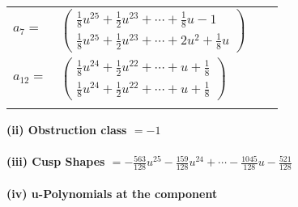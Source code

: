 \documentclass[1p]{elsarticle_modified}
\theoremstyle{definition}
\begin{document}
\begin{tabular}{m{7pt} m{180pt} m{7pt} m{180pt} }
\flushright $a_{7}=$&$\begin{pmatrix}\frac{1}{8} u^{25}+\frac{1}{2} u^{23}+\cdots+\frac{1}{8} u-1\\\frac{1}{8} u^{25}+\frac{1}{2} u^{23}+\cdots+2 u^2+\frac{1}{8} u\end{pmatrix}$ \\
\flushright $a_{12}=$&$\begin{pmatrix}\frac{1}{8} u^{24}+\frac{1}{2} u^{22}+\cdots+u+\frac{1}{8}\\\frac{1}{8} u^{24}+\frac{1}{2} u^{22}+\cdots+u+\frac{1}{8}\end{pmatrix}$\\&\end{tabular}
\flushleft \textbf{(ii) Obstruction class $= -1$}\\~\\
\flushleft \textbf{(iii) Cusp Shapes $= -\frac{563}{128} u^{25}-\frac{159}{128} u^{24}+\cdots-\frac{1045}{128} u-\frac{521}{128}$}\\~\\
\newpage\renewcommand{\arraystretch}{1}
\flushleft \textbf{(iv) u-Polynomials at the component}\newline \\
\end{document}
